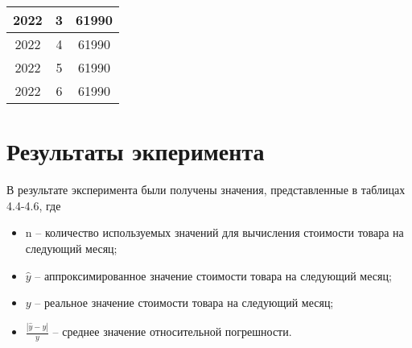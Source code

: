 \documentclass{bmstu}
\begin{document}
\begin{table}[H]
\begin{center}
\begin{tabular}{| c | c | c |}
			\hline
			
			2022 & 3 & 61990 \\
			
			\hline
			
			2022 & 4 & 61990 \\
			
			\hline
			
			2022 & 5 & 61990 \\
			
			\hline
			
			2022 & 6 & 61990 \\
			
			\hline
		\end{tabular}
	\end{center}
\end{table}

\section{Результаты экперимента}

В результате эксперимента были получены значения, представленные в таблицах 4.4-4.6, где

\begin{itemize}
	\item n -- количество используемых значений для вычисления стоимости товара на следующий месяц;
	\item $\hat{y}$ -- аппроксимированное значение стоимости товара на следующий месяц;
	\item $y$ -- реальное значение стоимости товара на следующий месяц;
	\item $\frac{|\hat{y} - y|}{y}$ -- среднее значение относительной погрешности.
\end{itemize}
\end{document}
